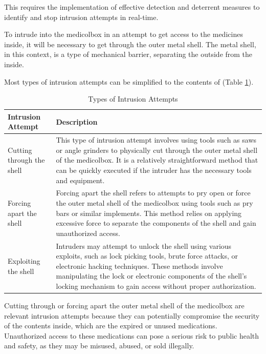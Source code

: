 \documentclass[../main.tex]{subfiles}
\begin{document}
This requires the implementation of effective detection
and deterrent measures to identify and stop
\gls{intrusion} attempts in real-time.

To intrude into the \gls{medicolbox} in an attempt to get access to
the medicines inside, it will be necessary to get through
the outer metal shell. The metal shell, in this context,
is a type of mechanical barrier,
separating the outside from the inside.

Most types of \gls{intrusion} attempts can be simplified to the contents of
(Table \ref{tab:TypesOfIntrusionAttempts}).

\begin{table}[htbp]
    \centering
    \caption{Types of Intrusion Attempts}
    \label{tab:TypesOfIntrusionAttempts}
    \begin{tabular}{|l|p{10cm}|} \hline
        \textbf{Intrusion Attempt} & \textbf{Description} \\ \hline
        Cutting through the shell & This type of intrusion attempt involves using tools such as saws or angle grinders to physically cut through the outer metal shell of the \gls{medicolbox}. It is a relatively straightforward method that can be quickly executed if the intruder has the necessary tools and equipment. \\ \hline
        Forcing apart the shell & Forcing apart the shell refers to attempts to pry open or force the outer metal shell of the \gls{medicolbox} using tools such as pry bars or similar implements. This method relies on applying excessive force to separate the components of the shell and gain unauthorized access. \\ \hline
        Exploiting the shell & Intruders may attempt to unlock the shell using various exploits, such as lock picking tools, brute force attacks, or electronic hacking techniques. These methods involve manipulating the lock or electronic components of the shell's locking mechanism to gain access without proper authorization. \\ \hline
    \end{tabular}
\end{table}

Cutting through or forcing apart the outer metal shell of
the \gls{medicolbox} are relevant \gls{intrusion} attempts because
they can potentially compromise the security of the contents inside,
which are the expired or unused medications.
Unauthorized access to these medications can pose a
serious risk to public health and safety, as they may be misused,
abused, or sold illegally.
\end{document}
